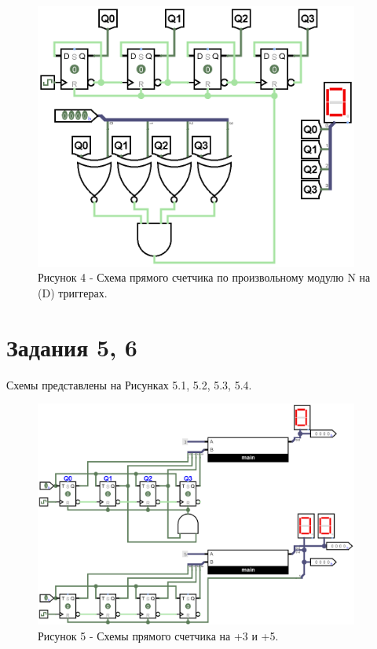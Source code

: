 \documentclass[oneside,a4paper,14pt]{extarticle}
\begin{document}
\begin{figure}[h!]
	\centering
	\includegraphics[width=0.95\textwidth]{pics/4.png}
	\caption*{Рисунок 4 - Схема прямого счетчика по произвольному модулю N на (D) триггерах.}
\end{figure}
\newpage

\section*{Задания 5, 6}

Схемы представлены на Рисунках 5.1, 5.2, 5.3, 5.4.\\
\begin{figure}[h!]
	\centering
	\includegraphics[width=0.95\textwidth]{pics/5.png}
	\caption*{Рисунок 5 - Схемы прямого счетчика на +3 и +5.}
\end{figure}
\end{document}

